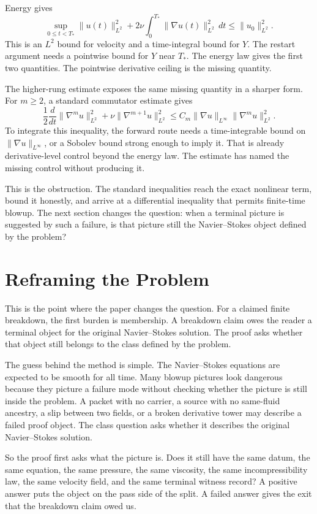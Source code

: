 \documentclass[11pt]{article}
\begin{document}
Energy gives
\[
  \sup_{0\le t<T_*}\|u(t)\|_{L^2}^2
  +2\nu\int_0^{T_*}\|\nabla u(t)\|_{L^2}^2\,dt
  \le
  \|u_0\|_{L^2}^2.
\]
This is an \(L^2\) bound for velocity and a time-integral bound for \(Y\).
The restart argument needs a pointwise bound for \(Y\) near \(T_*\).
The energy law gives the first two quantities.
The pointwise derivative ceiling is the missing quantity.

The higher-rung estimate exposes the same missing quantity in a sharper form.
For \(m\ge2\), a standard commutator estimate gives
\[
  \frac12\frac{d}{dt}\|\nabla^m u\|_{L^2}^2
  +\nu\|\nabla^{m+1}u\|_{L^2}^2
  \le
  C_m\|\nabla u\|_{L^\infty}\|\nabla^m u\|_{L^2}^2.
\]
To integrate this inequality, the forward route needs a time-integrable bound on \(\|\nabla u\|_{L^\infty}\), or a Sobolev bound strong enough to imply it.
That is already derivative-level control beyond the energy law.
The estimate has named the missing control without producing it.

This is the obstruction.
The standard inequalities reach the exact nonlinear term, bound it honestly, and arrive at a differential inequality that permits finite-time blowup.
The next section changes the question: when a terminal picture is suggested by such a failure, is that picture still the Navier--Stokes object defined by the problem?

\section{Reframing the Problem}

This is the point where the paper changes the question.
For a claimed finite breakdown, the first burden is membership.
A breakdown claim owes the reader a terminal object for the original Navier--Stokes solution.
The proof asks whether that object still belongs to the class defined by the problem.

The guess behind the method is simple.
The Navier--Stokes equations are expected to be smooth for all time.
Many blowup pictures look dangerous because they picture a failure mode without checking whether the picture is still inside the problem.
A packet with no carrier, a source with no same-fluid ancestry, a slip between two fields, or a broken derivative tower may describe a failed proof object.
The class question asks whether it describes the original Navier--Stokes solution.

So the proof first asks what the picture is.
Does it still have the same datum, the same equation, the same pressure, the same viscosity, the same incompressibility law, the same velocity field, and the same terminal witness record?
A positive answer puts the object on the pass side of the split.
A failed answer gives the exit that the breakdown claim owed us.
\end{document}
